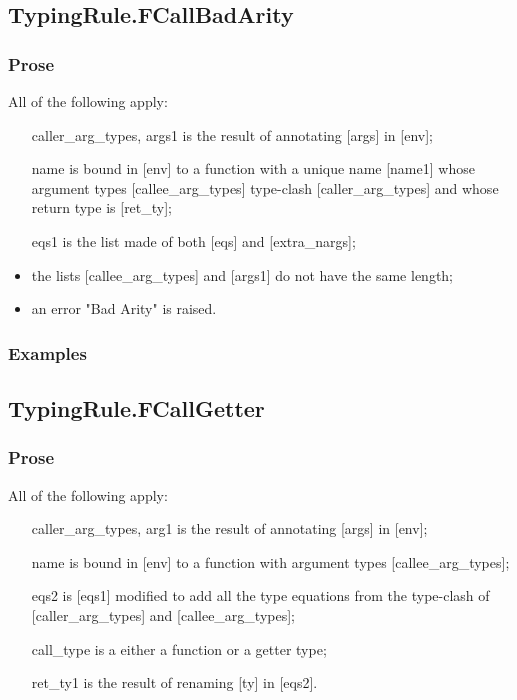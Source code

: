 \documentclass{book}
\begin{document}
\subsection{TypingRule.FCallBadArity}

    \subsubsection{Prose}
    All of the following apply:
   \begin{itemize}
   \item [caller\_arg\_types, args1] is the result of annotating [args] in [env];
   \item [name] is bound in [env] to a function with a unique name [name1]
      whose argument types [callee\_arg\_types] type-clash
      [caller\_arg\_types] and whose return type is [ret\_ty];
   \item [eqs1] is the list made of both [eqs] and [extra\_nargs];
   \item the lists [callee\_arg\_types] and [args1] do not have the same length;
   \item an error "Bad Arity" is raised.
   \end{itemize}

    \subsubsection{Examples}

\subsection{TypingRule.FCallGetter}

    \subsubsection{Prose}
    All of the following apply:
   \begin{itemize}
   \item [caller\_arg\_types, arg1] is the result of annotating [args] in [env];
   \item [name] is bound in [env] to a function with argument types
      [callee\_arg\_types];
   \item [eqs2] is [eqs1] modified to add all the type equations from the
      type-clash of [caller\_arg\_types] and [callee\_arg\_types];
   \item [call\_type] is a either a function or a getter type;
   \item [ret\_ty1] is the result of renaming [ty] in [eqs2].
   \end{itemize}
\end{document}
